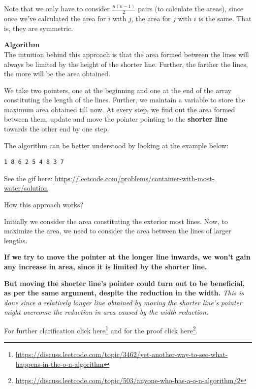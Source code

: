 Note that we only have to consider $\frac{n(n-1)}{2}$ pairs (to calculate
the areas), since once we've calculated the area for $i$ with $j$, the area
for $j$ with $i$ is the same.  That is, they are symmetric.


\noindent{}\textbf{Algorithm}\\
The intuition behind this approach is that the area formed between the lines
will always be limited by the height of the shorter line. Further, the
farther the lines, the more will be the area obtained.

We take two pointers, one at the beginning and one at the end of the array
constituting the length of the lines. Further, we maintain a variable
 to store the maximum area obtained till now. At every step, we
find out the area formed between them, update  and move the
pointer pointing to the \textbf{shorter line} towards the other end by one
step.

The algorithm can be better understood by looking at the example below:
\begin{lstlisting}[style=raygeneric]
1 8 6 2 5 4 8 3 7
\end{lstlisting}

See the gif here:
\url{https://leetcode.com/problems/container-with-most-water/solution}

How this approach works?

Initially we consider the area constituting the exterior most lines. Now, to
maximize the area, we need to consider the area between the lines of larger
lengths. 

\textbf{If we try to move the pointer at the longer line inwards, we won't
gain any increase in area, since it is limited by the shorter line.}

\textbf{But moving the shorter line's pointer could turn out to be
  beneficial, as per the same argument, despite the reduction in the width.}
 \emph{This is done since a relatively longer line
  obtained by moving the shorter line's pointer might overcome the reduction
  in area caused by the width reduction.}

For further clarification click
here\footnote{\url{https://discuss.leetcode.com/topic/3462/yet-another-way-to-see-what-happens-in-the-o-n-algorithm}}
and for the proof click
here\footnote{\url{https://discuss.leetcode.com/topic/503/anyone-who-has-a-o-n-algorithm/2}}.

